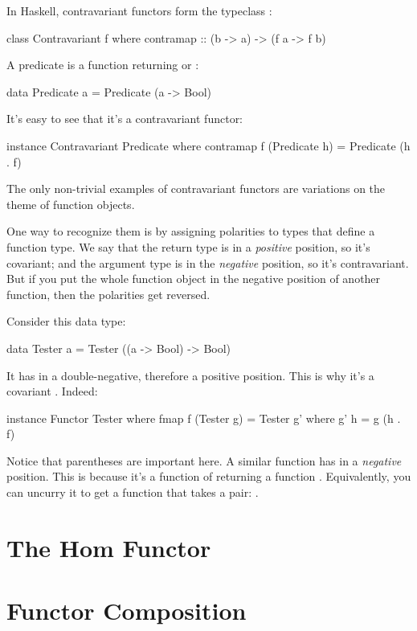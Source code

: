 \documentclass[DaoFP]{subfiles}
\begin{document}
In Haskell, contravariant functors form the typeclass :
\begin{haskell}
class Contravariant f where
  contramap :: (b -> a) -> (f a -> f b)
\end{haskell}

A predicate is a function returning  or :
\begin{haskell}
data Predicate a = Predicate (a -> Bool)
\end{haskell}
It's easy to see that it's a contravariant functor:
\begin{haskell}
instance Contravariant Predicate where
  contramap f (Predicate h) = Predicate (h . f)
\end{haskell}

The only non-trivial examples of contravariant functors are variations on the theme of function objects. 

One way to recognize them is by assigning polarities to types that define a function type. We say that the return type is in a \emph{positive} position, so it's covariant; and the argument type is in the \emph{negative} position, so it's contravariant. But if you put the whole function object in the negative position of another function, then the polarities get reversed. 

Consider this data type:
\begin{haskell}
data Tester a = Tester ((a -> Bool) -> Bool)
\end{haskell}
It has  in a double-negative, therefore a positive position. This is why it's a covariant . Indeed:

\begin{haskell}
instance Functor Tester where
  fmap f (Tester g) = Tester g'
    where g' h = g (h . f)
\end{haskell}

Notice that parentheses are important here. A similar function  has  in a \emph{negative} position. This is because it's a function of  returning a function . Equivalently, you can uncurry it to get a function that takes a pair: .

\section{The Hom Functor}


\section{Functor Composition}
\end{document}
